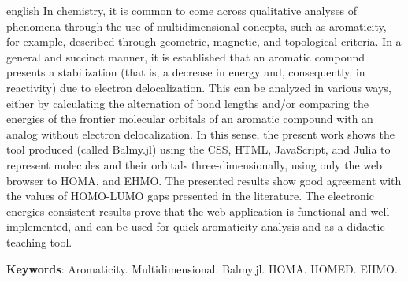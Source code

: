\begin{resumo}[Abstract]
	\SingleSpacing
	\begin{otherlanguage*}{english}
In chemistry, it is common to come across qualitative analyses of phenomena through the use of multidimensional concepts, such as aromaticity, for example, described through geometric, magnetic, and topological criteria. In a general and succinct manner, it is established that an aromatic compound presents a stabilization (that is, a decrease in energy and, consequently, in reactivity) due to electron delocalization. This can be analyzed in various ways, either by calculating the alternation of bond lengths and/or comparing the energies of the frontier molecular orbitals of an aromatic compound with an analog without electron delocalization. In this sense, the present work shows the tool produced (called Balmy.jl) using the \gls{CSS}, \gls{HTML}, JavaScript, and Julia to represent molecules and their orbitals three-dimensionally, using only the web browser to \gls{HOMA}, and \gls{EHMO}. The presented results show good agreement with the values of \gls{HOMO}-\gls{LUMO} gaps presented in the literature. The electronic energies consistent results prove that the web application is functional and well implemented, and can be used for quick aromaticity analysis and as a didactic teaching tool.
		
		\textbf{Keywords}: Aromaticity. Multidimensional. Balmy.jl. \gls{HOMA}. \gls{HOMED}. \gls{EHMO}.
	\end{otherlanguage*}
\end{resumo}

% 
%
%  

